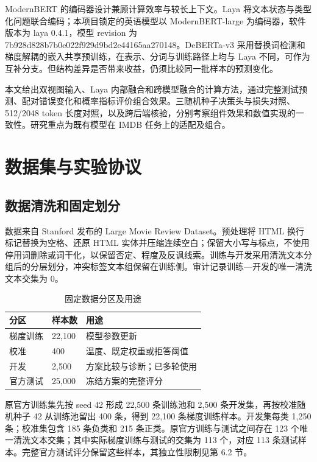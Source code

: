\documentclass[UTF8,fontset=fandol,a4paper,11pt]{ctexart}
\begin{document}
ModernBERT 的编码器设计兼顾计算效率与较长上下文\cite{modernbert}。Laya 将文本状态与类型化问题联合编码\cite{laya}；本项目锁定的英语模型以 ModernBERT-large 为编码器，软件版本为 laya 0.4.1，模型 revision 为 7b928d828b7b0e022f929d9bd2e44165aa270148。DeBERTa-v3 采用替换词检测和梯度解耦的嵌入共享预训练\cite{deberta}，在表示、分词与训练路径上均与 Laya 不同，可作为互补分支。但结构差异是否带来收益，仍须比较同一批样本的预测变化。

本文给出双视图输入、Laya 内部融合和跨模型融合的计算方法，通过完整测试预测、配对错误变化和概率指标评价组合效果。三随机种子决策头与损失对照、512/2048 token 长度对照，以及跨后端核验，分别考察组件效果和数值实现的一致性。研究重点为既有模型在 IMDB 任务上的适配及组合。

\section{数据集与实验协议}
\subsection{数据清洗和固定划分}
数据来自 Stanford 发布的 Large Movie Review Dataset\cite{maas}。预处理将 HTML 换行标记替换为空格、还原 HTML 实体并压缩连续空白；保留大小写与标点，不使用停用词删除或词干化，以保留否定、程度及反讽线索。训练与开发采用清洗文本分组后的分层划分，冲突标签文本组保留在训练侧。审计记录训练—开发的唯一清洗文本交集为 0。

\begin{table}[htbp]\centering\caption{固定数据分区及用途}\label{tab:t1}\small\renewcommand{\arraystretch}{1.25}
\begin{tabularx}{\linewidth}{YYY}\toprule
\textbf{分区} & \textbf{样本数} & \textbf{用途}\\\midrule
梯度训练 & 22,100 & 模型参数更新\\
校准 & 400 & 温度、既定权重或拒答阈值\\
开发 & 2,500 & 方案比较与诊断；已多轮使用\\
官方测试 & 25,000 & 冻结方案的完整评分\\
\bottomrule\end{tabularx}\end{table}
原官方训练集先按 seed 42 形成 22,500 条训练池和 2,500 条开发集，再按校准随机种子 42 从训练池留出 400 条，得到 22,100 条梯度训练样本。开发集每类 1,250 条；校准集包含 185 条负类和 215 条正类。原官方训练与测试之间存在 123 个唯一清洗文本交集；其中实际梯度训练与测试的交集为 113 个，对应 113 条测试样本。完整官方测试评分保留这些样本，其独立性限制见第 6.2 节。
\end{document}
